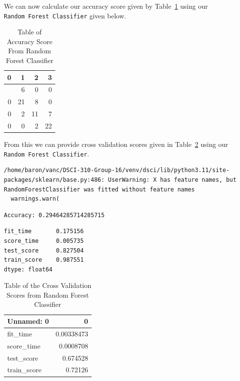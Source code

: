\documentclass[
  letterpaper,
  DIV=11,
  numbers=noendperiod]{scrartcl}
\begin{document}
We can now calculate our accuracy score given by
Table~\ref{tbl-accuracy-score} using our
\texttt{Random\ Forest\ Classifier} given below.

\begin{longtable}[]{@{}rrrr@{}}

\caption{\label{tbl-accuracy-score}Table of Accuracy Score From Random
Forest Classifier}

\tabularnewline

\toprule\noalign{}
0 & 1 & 2 & 3 \\
\midrule\noalign{}
\endhead
\bottomrule\noalign{}
\endlastfoot
0 & 6 & 0 & 0 \\
0 & 21 & 8 & 0 \\
0 & 2 & 11 & 7 \\
0 & 0 & 2 & 22 \\

\end{longtable}

From this we can provide cross validation scores given in
Table~\ref{tbl-rfc-cross-validate} using our
\texttt{Random\ Forest\ Classifier}.

\begin{verbatim}
/home/baron/vanc/DSCI-310-Group-16/venv/dsci/lib/python3.11/site-packages/sklearn/base.py:486: UserWarning: X has feature names, but RandomForestClassifier was fitted without feature names
  warnings.warn(
\end{verbatim}

\begin{verbatim}
Accuracy: 0.29464285714285715
\end{verbatim}

\begin{verbatim}
fit_time       0.175156
score_time     0.005735
test_score     0.827504
train_score    0.987551
dtype: float64
\end{verbatim}

\begin{longtable}[]{@{}lr@{}}

\caption{\label{tbl-rfc-cross-validate}Table of the Cross Validation
Scores from Random Forest Classifier}

\tabularnewline

\toprule\noalign{}
Unnamed: 0 & 0 \\
\midrule\noalign{}
\endhead
\bottomrule\noalign{}
\endlastfoot
fit\_time & 0.00338473 \\
score\_time & 0.0008708 \\
test\_score & 0.674528 \\
train\_score & 0.72126 \\

\end{longtable}
\end{document}
